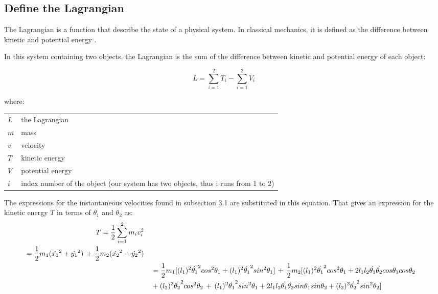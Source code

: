 \documentclass[a4paper,12pt]{article}
\makeatletter
\newenvironment{conditions}
  {\par\vspace{\abovedisplayskip}\noindent\begin{tabular}{>{$}l<{$} @{${}={}$} l}}
  {\end{tabular}\par\vspace{\belowdisplayskip}}
\makeatother
\begin{document}
\subsection{Define the Lagrangian}
The Lagrangian is a function that describe the state of a physical system. In classical
mechanics, it is defined as the difference between kinetic and potential energy \cite{lagrangian-func}.

In this system containing two objects, the Lagrangian is the sum of the difference between kinetic and potential energy of each object:
\begin{center}\[L=\sum_{i=1}^{2 }T_i-\sum_{i=1}^{2 }V_i\]\end{center}
where:
\begin{conditions}
    L & the Lagrangian \\
    m & mass \\
    v & velocity \\
    T & kinetic energy \\
    V & potential energy \\ 
    i & index number of the object (our system has two objects, thus i runs from 1 to 2)
\end{conditions} 
The expressions for the instantaneous velocities found in subsection 3.1 are substituted in this equation. That gives an expression for the kinetic energy $T$ in terms of $\theta_1$ and $\theta_2$ as: 
\begin{align*}
    \begin{split}
        T &= \frac{1}{2}\sum_{i=1}^{ 2}m_iv_i^2 
    \end{split}\\
    \begin{split}
        &= \frac{1}{2}  m_1(\dot{x_1}^2+\dot{y_1}^2)\thinspace + \thinspace \frac{1}{2}m_2(\dot{x_2}^2+\dot{y_2}^2)
    \end{split}\\
            &=\frac{1}{2}m_1[(l_1)^2\dot{\theta_1}^2cos^2\theta_1 + (l_1)^2 \dot{\theta_1}^2sin^2\theta_1] \thinspace + \thinspace \frac{1}{2}m_2[ (l_1)^2\dot{\theta_1}^2cos^2\theta_1 +2l_1l_2\dot{\theta_1}\dot{\theta_2}cos\theta_1cos\theta_2
            \\&\space +(l_2)^2\dot{\theta_2}^2cos^2\theta_2 \thinspace + \thinspace (l_1)^2\dot{\theta_1}^2sin^2\theta_1 +2l_1l_2\dot{\theta_1}\dot{\theta_2}sin\theta_1sin\theta_2+(l_2)^2\dot{\theta_2}^2sin^2\theta_2] 
\end{align*}
\end{document}
